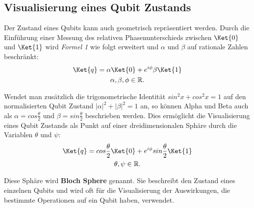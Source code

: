 \subsection{Visualisierung eines Qubit Zustands}
\newline
{}

Der Zustand eines Qubits kann auch geometrisch repräsentiert werden. Durch die Einführung einer Messung des relativen Phasenunterschieds zwischen \(\Ket{0}\) und \(\Ket{1}\) wird \textit{Formel 1} wie folgt erweitert und \(\alpha\) und \(\beta\) auf rationale Zahlen beschränkt:
\begin{equation} \begin{gathered}
        \Ket{q} = \alpha \Ket{0} + e^{i\phi} \beta  \Ket{1} \\
        \alpha, \beta, \phi \in \mathbb{R}.
    \end{gathered} \end{equation}

Wendet man zusätzlich die trigonometrische Identität \(sin^2x + cos^2x = 1\) auf den normalisierten Qubit Zustand \(|\alpha|^2 + |\beta|^2 = 1\) an, so können Alpha und Beta auch als \(\alpha = cos\frac{\theta}{2}\) und \(\beta = sin\frac{\theta}{2}\) beschrieben werden. Dies ermöglicht die Visualisierung eines Qubit Zustands als Punkt auf einer dreidimensionalen Sphäre durch die Variablen \(\theta\) und \(\psi\):
\begin{equation} \begin{gathered}
        \Ket{q} = cos\frac{\theta}{2} \Ket{0} + e^{i\phi} sin\frac{\theta}{2}  \Ket{1} \\
        \theta, \psi \in \mathbb{R}.
    \end{gathered} \end{equation}

Diese Sphäre wird \textbf{Bloch Sphere} genannt. Sie beschreibt den Zustand eines einzelnen Qubits und wird oft für die Visualisierung der Auswirkungen, die bestimmte Operationen auf ein Qubit haben, verwendet.



